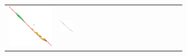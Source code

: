 \begin{figure}[H]
\begin{tabular}{l>{\centering}m{0.12\linewidth}>{\centering}m{0.12\linewidth}>{\centering}m{0.12\linewidth}>{\centering\arraybackslash}m{0.35\linewidth}}
    \includegraphics[scale=0.09]{imgs/comparison/gcsh.png} &
    \includegraphics[scale=0.09]{imgs/comparison/gcsh-noprune-dt.png} &

\end{tabular}
\end{figure}
